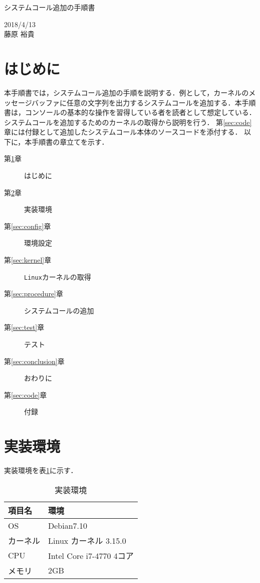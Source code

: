 \documentclass[12pt]{jsarticle}
\begin{document}
\begin{center}
{\LARGE システムコール追加の手順書}
\end{center}

\begin{flushright}
  2018/4/13 \\
 藤原 裕貴
\end{flushright}
\section{はじめに}\label{sec:introduction}
本手順書では，システムコール追加の手順を説明する．例として，カーネルのメッセージバッファに任意の文字列を出力するシステムコールを追加する．本手順書は，コンソールの基本的な操作を習得している者を読者として想定している．システムコールを追加するためのカーネルの取得から説明を行う．
第\ref{sec:code}章には付録として追加したシステムコール本体のソースコードを添付する．
以下に，本手順書の章立てを示す．

\begin{description}
\item [第\ref{sec:introduction}章] はじめに
\item [第\ref{sec:env}章] 実装環境
\item [第\ref{sec:config}章] 環境設定
\item [第\ref{sec:kernel}章] \verb|Linux|カーネルの取得
\item [第\ref{sec:procedure}章] システムコールの追加
\item [第\ref{sec:test}章] テスト
\item [第\ref{sec:conclusion}章] おわりに
\item [第\ref{sec:code}章] 付録


\end{description}

\section{実装環境}\label{sec:env}
実装環境を表\ref{tab:env}に示す．

\begin{table}[h]
  \begin{center}
    \caption{実装環境}\label{tab:env}
    \begin{tabular}{l|l}
      \hline\hline
      \multicolumn{1}{l|}{項目名} & \multicolumn{1}{l}{環境} \\
      \hline
      OS & Debian7.10 \\
      カーネル & Linux カーネル 3.15.0 \\
      CPU & Intel Core i7-4770 4コア\\
      メモリ & 2GB \\
      \hline
    \end{tabular}
  \end{center}
\end{table}
\end{document}
